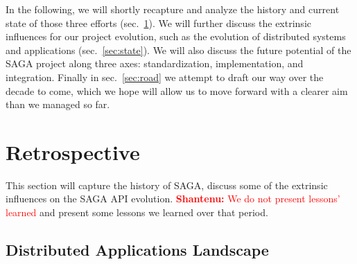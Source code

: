\documentclass[]{article}
\newcommand{\B}[1]{\textbf{#1}}
\newcommand{\smilie}{\small;-)~\xspace}
\newcommand{\jhanote}[1]{{\textcolor{red}{     \B{Shantenu:} #1 }}}
\newcommand{\jhanote}[1]{}
\begin{document}

In the following, we will shortly recapture and analyze the history
and current state of those three efforts (sec.~\ref{sec:retro}).  We
will further discuss the extrinsic influences for our project
evolution, such as the evolution of distributed systems and
applications (sec.~\ref{sec:state}).  We will also discuss the future
potential of the SAGA project along three axes: standardization,
implementation, and integration.  Finally in sec.~\ref{sec:road} we
attempt to draft our way over the decade to come, which we hope will
allow us to move forward with a clearer aim than we managed so far.



\section{Retrospective}
\label{sec:retro}

This section will capture the history of SAGA, discuss some of the
extrinsic influences on the SAGA API evolution.  \jhanote{We do not
  present lessons' learned} and present some lessons we learned over
that period.  



\subsection{Distributed Applications Landscape}
\end{document}
